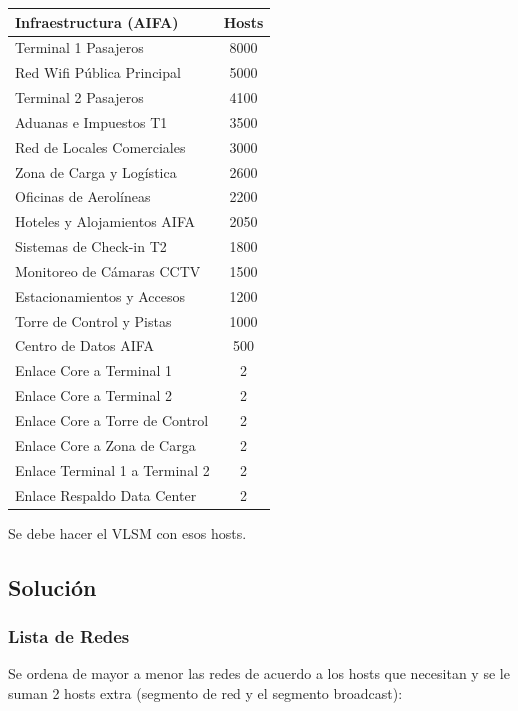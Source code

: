 \begin{tcolorbox}[enunciado]
\vspace{0.3cm}
\begin{center}
    \begin{tabular}{lc}
    \toprule
    \textbf{Infraestructura (AIFA)} & \textbf{Hosts} \\
    \midrule
    Terminal 1 Pasajeros & 8000 \\
    Red Wifi Pública Principal & 5000 \\
    Terminal 2 Pasajeros & 4100 \\
    Aduanas e Impuestos T1 & 3500 \\
    Red de Locales Comerciales & 3000 \\
    Zona de Carga y Logística & 2600 \\
    Oficinas de Aerolíneas & 2200 \\
    Hoteles y Alojamientos AIFA & 2050 \\
    Sistemas de Check-in T2 & 1800 \\
    Monitoreo de Cámaras CCTV & 1500 \\
    Estacionamientos y Accesos & 1200 \\
    Torre de Control y Pistas & 1000 \\
    Centro de Datos AIFA & 500 \\
    Enlace Core a Terminal 1 & 2 \\
    Enlace Core a Terminal 2 & 2 \\
    Enlace Core a Torre de Control & 2 \\
    Enlace Core a Zona de Carga & 2 \\
    Enlace Terminal 1 a Terminal 2 & 2 \\
    Enlace Respaldo Data Center & 2 \\
    \bottomrule
    \end{tabular}
\end{center}
\vspace{0.3cm}

Se debe hacer el VLSM con esos hosts.
\end{tcolorbox}

\subsection*{Solución}
\subsubsection*{Lista de Redes}
Se ordena de mayor a menor las redes de acuerdo a los hosts que necesitan y se le suman 2 hosts extra (segmento de red y el segmento broadcast):

